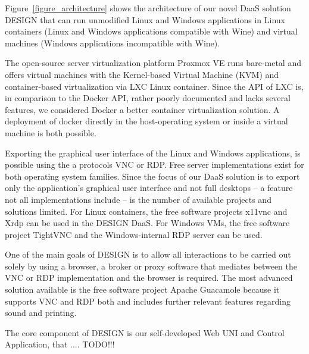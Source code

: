 \documentclass[runningheads]{llncs}
\begin{document}
Figure~\ref{figure_architecture} shows the architecture of our novel DaaS solution DESIGN that can run unmodified Linux and Windows applications in Linux containers (Linux and Windows applications compatible with Wine) and virtual machines (Windows applications incompatible with Wine).

The open-source server virtualization platform Proxmox VE runs bare-metal and offers virtual machines with the Kernel-based Virtual Machine (KVM) and container-based virtualization via LXC Linux container. Since the API of LXC is, in comparison to the Docker API, rather poorly documented and lacks several features, we considered Docker a better container virtualization solution. A deployment of docker directly in the host-operating system or inside a virtual machine is both possible.

Exporting the graphical user interface of the Linux and Windows applications,
is possible using the a protocols VNC or RDP. Free server implementations exist for both operating system families. Since the focus of our DaaS solution is to export only the application's graphical user interface and not full desktops -- a feature not all implementations include -- is the number of available projects and solutions limited. 
For Linux containers, the free software projects x11vnc and Xrdp can be used in the DESIGN DaaS. For Windows VMs, the free software project TightVNC and the Windows-internal RDP server can be used. 

One of the main goals of DESIGN is to allow all interactions to be carried out solely by using a browser, a broker or proxy software that mediates between the VNC or RDP implementation and the browser is required. The most advanced solution available is the free software project Apache Guacamole because it supports VNC and RDP both and includes further relevant features regarding sound and printing.

The core component of DESIGN is our self-developed Web UNI and Control Application, that .... TODO!!!
\end{document}
